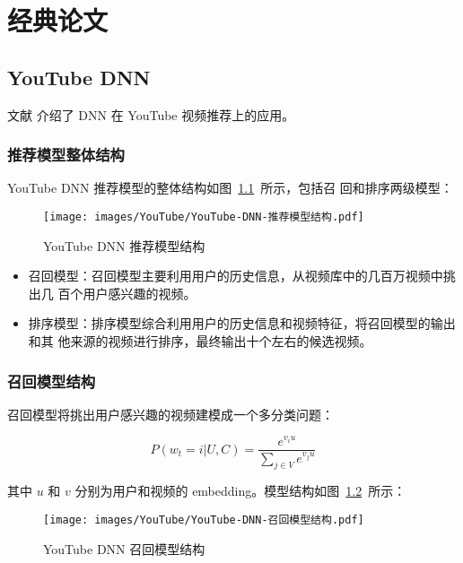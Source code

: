 \chapter{经典论文}
\section{YouTube DNN}

文献  介绍了 DNN 在 YouTube 视频推荐上的应用。

\subsection{推荐模型整体结构}
YouTube DNN 推荐模型的整体结构如图~\ref{fig:youtube-dnn-structure}~所示，包括召
回和排序两级模型：

\begin{figure}[ht]
  \centering
  \texttt{[image: images/YouTube/YouTube-DNN-推荐模型结构.pdf]}
  \caption{YouTube DNN 推荐模型结构}
  \label{fig:youtube-dnn-structure}
\end{figure}

\begin{itemize}
  \item 召回模型：召回模型主要利用用户的历史信息，从视频库中的几百万视频中挑出几
    百个用户感兴趣的视频。
  \item 排序模型：排序模型综合利用用户的历史信息和视频特征，将召回模型的输出和其
    他来源的视频进行排序，最终输出十个左右的候选视频。
\end{itemize}

\subsection{召回模型结构}
召回模型将挑出用户感兴趣的视频建模成一个多分类问题：

\begin{equation}
  P(w_t=i|U, C) = \frac{e^{v_i u}}{\sum_{j \in V} e^{v_j u}}
\end{equation}

其中 $u$ 和 $v$ 分别为用户和视频的 embedding。模型结构如图~\ref{fig:youtube-dnn-retrieval-structure}~所示：

\begin{figure}[ht]
  \centering
  \texttt{[image: images/YouTube/YouTube-DNN-召回模型结构.pdf]}
  \caption{YouTube DNN 召回模型结构}
  \label{fig:youtube-dnn-retrieval-structure}
\end{figure}

